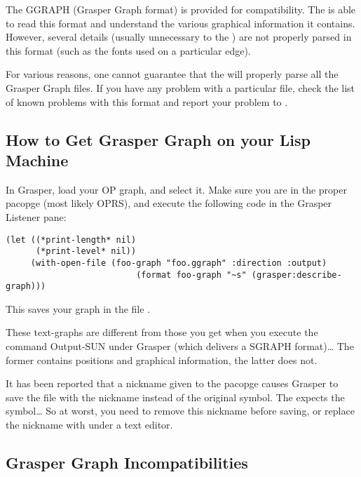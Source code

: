 The GGRAPH (Grasper Graph format) is provided for compatibility. The
\OPE{} is able to read this format and understand the various graphical
information it contains. However, several details
(usually unnecessary to the \CPK{}) are not properly parsed in
this format (such as the fonts used on a particular edge).

For various reasons, one cannot guarantee that the \OPE{} will
properly parse all the Grasper Graph files. If you have any problem with
a particular file, check the list of known problems with this format and
report your problem to .



\subsection{How to Get Grasper Graph on your Lisp Machine}

In Grasper, load your OP graph, and select it. Make sure you are in the
proper pacopge (most likely OPRS), and execute the following code in the
Grasper Listener pane:

\begin{verbatim}
(let ((*print-length* nil)
      (*print-level* nil))
     (with-open-file (foo-graph "foo.ggraph" :direction :output)
                          (format foo-graph "~s" (grasper:describe-graph)))
\end{verbatim}

This saves your graph in the file .

 These text-graphs are different from those you get when
you
execute the command Output-SUN under Grasper (which delivers a SGRAPH
format)\dots{} The former contains positions and graphical information, the
latter does not.

It has been reported that a nickname given to the pacopge 
causes Grasper to save the file with the nickname instead of the original
 symbol. The \OPE{} expects the  symbol\dots{}
So at worst, you need to remove this nickname before saving, or
replace the nickname with  under a text editor.

\subsection{Grasper Graph Incompatibilities}

